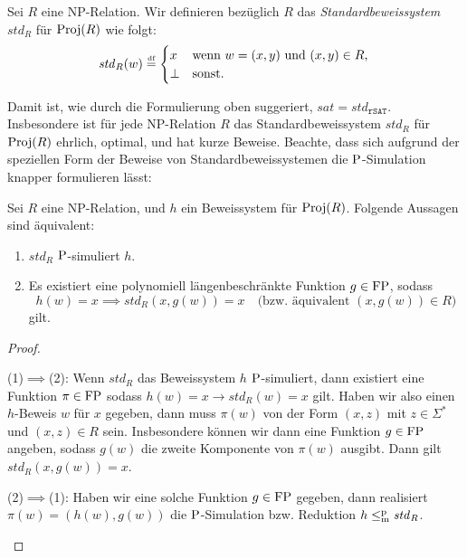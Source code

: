 \begin{definition}
    Sei $R$ eine NP-Relation. Wir definieren bezüglich $R$ das \emph{Standardbeweissystem} $\mathit{std}_R$ für $\Proj(R)$ wie folgt:
    \[ \mathit{std}_R(w) \defeq \begin{cases} x & \text{wenn $w=(x,y)$ und $(x,y)\in R$,}\\
    \bot & \text{sonst}.\end{cases} \qedhere \] 
\end{definition}
Damit ist, wie durch die Formulierung oben suggeriert, $\mathit{sat}=\mathit{std}_{\mathtt{rSAT}}$.
Insbesondere ist für jede NP-Relation $R$ das Standardbeweissystem $\mathit{std}_R$ für $\Proj(R)$ ehrlich, optimal, und hat kurze Beweise.
Beachte, dass sich aufgrund der speziellen Form der Beweise von Standardbeweissystemen die $\P$-Simulation knapper formulieren lässt:
\begin{observation}\label{obs:simulation-of-spps}
    Sei $R$ eine NP-Relation, und $h$ ein Beweissystem für $\Proj(R)$. Folgende Aussagen sind äquivalent:
    \begin{enumerate}
        \item $\mathit{std}_R$ $\P$-simuliert $h$.
        \item Es existiert eine polynomiell längenbeschränkte Funktion $g\in\FP$, sodass
            \[ h(w)=x \implies \mathit{std}_R(x, g(w))=x \quad\text{(bzw. äquivalent $(x, g(w))\in R$)} \]
            gilt.
    \end{enumerate}
\end{observation}
\begin{proof}
    \begin{prooflist}
    (1)$\implies$(2): Wenn $\mathit{std}_R$ das Beweissystem $h$ $\P$-simuliert, dann existiert eine Funktion $\pi\in\FP$ sodass $h(w)=x\rightarrow \mathit{std}_R(w)=x$ gilt.
    Haben wir also einen $h$-Beweis $w$ für $x$ gegeben, dann muss $\pi(w)$ von der Form $(x, z)$ mit $z\in\Sigma^*$ und $(x,z)\in R$ sein. Insbesondere können wir dann eine Funktion $g\in\FP$ angeben, sodass $g(w)$ die zweite Komponente von $\pi(w)$ ausgibt. Dann gilt $\mathit{std}_R(x, g(w))=x$.

    (2)$\implies$(1): Haben wir eine solche Funktion $g\in\FP$ gegeben, dann realisiert $\pi(w)=(h(w), g(w))$ die $\P$-Simulation bzw. Reduktion $h\leqmp \mathit{std}_R$.
    \end{prooflist}
\end{proof}


